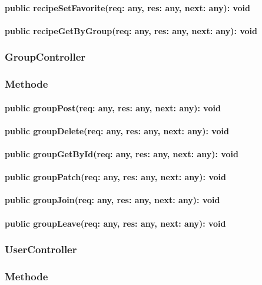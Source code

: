 \documentclass[parskip=full]{scrartcl}
\begin{document}
\paragraph{public recipeSetFavorite(req: any, res: any, next: any): void}
\paragraph{public recipeGetByGroup(req: any, res: any, next: any): void}

\subsubsection{GroupController}
\subsubsection*{Methode}
\paragraph{public groupPost(req: any, res: any, next: any): void}
\paragraph{public groupDelete(req: any, res: any, next: any): void}
\paragraph{public groupGetById(req: any, res: any, next: any): void}
\paragraph{public groupPatch(req: any, res: any, next: any): void}
\paragraph{public groupJoin(req: any, res: any, next: any): void}
\paragraph{public groupLeave(req: any, res: any, next: any): void}

\subsubsection{UserController}
\subsubsection*{Methode}
\end{document}

